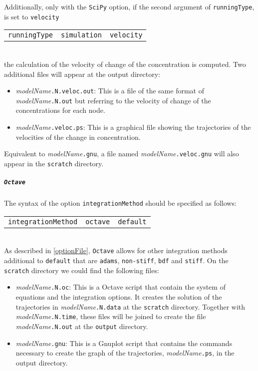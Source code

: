 \documentclass[a4paper, 11pt]{article}
\begin{document}
Additionally, only with the \texttt{SciPy} option, if the second argument of \texttt{runningType}, is set to \texttt{velocity}\\[1.5ex]
\begin{tabular}{ccc}\texttt{runningType}&\texttt{simulation}&\texttt{velocity}\end{tabular}\\[1.5ex]
the calculation of the velocity of change of the concentration is computed.
Two additional files will appear at the output directory:
\begin{itemize}
\item \textit{modelName}\texttt{.N.veloc.out}:
  This is a file of the same format of \textit{modelName}\texttt{.N.out} but referring to the velocity of change of the concentrations for each node.
\item \textit{modelName}\texttt{.veloc.ps}:
  This is a graphical file showing the trajectories of the velocities of the change in concentration.
\end{itemize}
Equivalent to \textit{modelName}\texttt{.gnu}, a file named \textit{modelName}\texttt{.veloc.gnu} will also appear in the \texttt{scratch} directory.
\subparagraph{\texttt{Octave}}
The syntax of the option \texttt{integrationMethod} should be specified as follows:\\[1.5ex]
\begin{tabular}{ccc}\texttt{integrationMethod}&\texttt{octave}&\texttt{default}\end{tabular}\\[1.5ex]
As described in \ref{optionFile}, \texttt{Octave} allows for other integration methods additional to \texttt{default} that are \texttt{adams}, \texttt{non-stiff}, \texttt{bdf} and \texttt{stiff}.
On the \texttt{scratch} directory  we could find the following files:
\begin{itemize}
\item \textit{modelName}\texttt{.N.oc}:
  This is a Octave script that contain the system of equations and the integration options.
  It creates the solution of the trajectories in \textit{modelName}\texttt{.N.data} at the \texttt{scratch} directory.
  Together with \textit{modelName}\texttt{.N.time}, these files will be joined to create the file \textit{modelName}\texttt{.N.out} at the \texttt{output} directory.
\item \textit{modelName}\texttt{.gnu}:
  This is a Gnuplot script that contains the commands necessary to create the graph of the trajectories, \textit{modelName}\texttt{.ps}, in the output directory.
\end{itemize}
\end{document}

